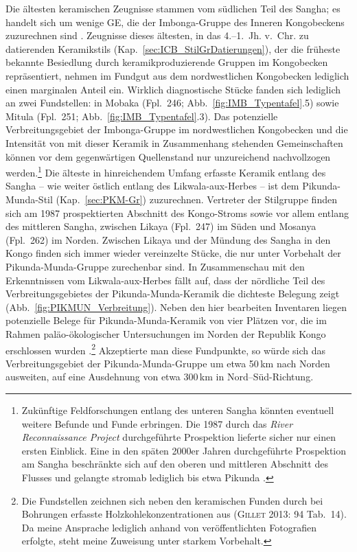 Die ältesten keramischen Zeugnisse stammen vom südlichen Teil des \mbox{Sangha}; es handelt sich um wenige GE, die der Imbonga-Gruppe des Inneren Kongobeckens zuzurechnen sind \parencite[Kap.~\ref{sec:IMB-Gr};][59--68]{Wotzka.1995}. Zeugnisse dieses ältesten, in das 4.--1.~Jh. v.~Chr. zu datierenden Keramikstils (Kap.~\ref{sec:ICB_StilGrDatierungen}), der die früheste bekannte Besiedlung durch keramikproduzierende Gruppen im Kongobecken repräsentiert, nehmen im Fundgut aus dem nordwestlichen Kongobecken lediglich einen marginalen Anteil ein. Wirklich diagnostische Stücke fanden sich lediglich an zwei Fundstellen: in Mobaka (Fpl.~246; Abb.~\ref{fig:IMB_Typentafel}.5) sowie Mitula (Fpl.~251; Abb.~\ref{fig:IMB_Typentafel}.3). Das potenzielle Verbreitungsgebiet der Imbonga-Gruppe im nordwestlichen Kongobecken und die Intensität von mit dieser Keramik in Zusammenhang stehenden Gemeinschaften können vor dem gegenwärtigen Quellenstand nur unzureichend nachvollzogen werden.\footnote{Zukünftige Feldforschungen entlang des unteren \mbox{Sangha} könnten eventuell weitere Befunde und Funde erbringen. Die 1987 durch das \textit{River Reconnaissance Project} durchgeführte Prospektion lieferte sicher nur einen ersten Einblick. Eine in den späten 2000er Jahren durchgeführte Prospektion am \mbox{Sangha} beschränkte sich auf den oberen und mittleren Abschnitt des Flusses und gelangte stromab lediglich bis etwa Pikunda \parencite[Fpl.~255; siehe][211 Abb.~1]{MorinRivat.2014}.} Die älteste in hinreichendem Umfang erfasste Keramik entlang des \mbox{Sangha} -- wie weiter östlich entlang des  \mbox{Likwala}-\mbox{aux}-\mbox{Herbes} -- ist dem Pikunda-Munda-Stil (Kap.~\ref{sec:PKM-Gr}) zuzurechnen. Vertreter der Stilgruppe finden sich am 1987 prospektierten Abschnitt des Kongo-Stroms sowie vor allem entlang des mittleren \mbox{Sangha}, zwischen Likaya (Fpl.~247) im Süden und Mosanya (Fpl.~262) im Norden. Zwischen Likaya und der Mündung des \mbox{Sangha} in den Kongo finden sich immer wieder vereinzelte Stücke, die nur unter Vorbehalt der Pikunda-Munda-Gruppe zurechenbar sind. In Zusammenschau mit den Erkenntnissen vom \mbox{Likwala}-\mbox{aux}-\mbox{Herbes} fällt auf, dass der nördliche Teil des Verbreitungsgebietes der Pikunda-Munda-Keramik die dichteste Belegung zeigt (Abb.~\ref{fig:PIKMUN_Verbreitung}). Neben den hier bearbeiten Inventaren liegen potenzielle Belege für Pikunda-Munda-Keramik von vier Plätzen vor, die im Rahmen paläo-ökologischer Untersuchungen im Norden der Republik Kongo erschlossen wurden \parencite[Abb.~\ref{fig:PIKMUN_Verbreitung};][114 Abb.~42]{Gillet.2013}.\footnote{Die Fundstellen zeichnen sich neben den keramischen Funden durch bei Bohrungen erfasste Holzkohlekonzentrationen aus (\textsc{Gillet} 2013: 94 Tab.~14). Da meine Ansprache lediglich anhand von veröffentlichten Fotografien erfolgte, steht meine Zuweisung unter starkem Vorbehalt.} Akzeptierte man diese Fundpunkte, so würde sich das Verbreitungsgebiet der Pikunda-Munda-Gruppe um etwa 50\,km nach Norden ausweiten, auf eine Ausdehnung von etwa 300\,km in Nord--Süd-Richtung.

